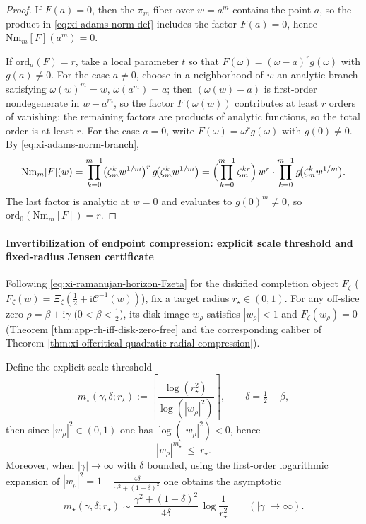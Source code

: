 \begin{proof}
If \(F(a)=0\), then the \(\pi_m\)-fiber over \(w=a^m\) contains the point \(a\), so the product in \eqref{eq:xi-adams-norm-def} includes the factor \(F(a)=0\), hence \(\mathrm{Nm}_m[F](a^m)=0\).
\par
If \(\mathrm{ord}_a(F)=r\), take a local parameter \(t\) so that \(F(\omega)=(\omega-a)^r g(\omega)\) with \(g(a)\neq 0\).
For the case \(a\neq 0\), choose in a neighborhood of \(w\) an analytic branch satisfying \(\omega(w)^m=w\), \(\omega(a^m)=a\); then
\((\omega(w)-a)\) is first-order nondegenerate in \(w-a^m\), so the factor \(F(\omega(w))\) contributes at least \(r\) orders of vanishing; the remaining factors are products of analytic functions, so the total order is at least \(r\).
For the case \(a=0\), write \(F(\omega)=\omega^{r}g(\omega)\) with \(g(0)\neq 0\).
By \eqref{eq:xi-adams-norm-branch},
\[
\mathrm{Nm}_m[F](w)
=\prod_{k=0}^{m-1}\bigl(\zeta_m^k w^{1/m}\bigr)^{r}\,g\!\bigl(\zeta_m^k w^{1/m}\bigr)
=\Bigl(\prod_{k=0}^{m-1}\zeta_m^{kr}\Bigr)\,w^{r}\cdot \prod_{k=0}^{m-1}g\!\bigl(\zeta_m^k w^{1/m}\bigr).
\]
The last factor is analytic at \(w=0\) and evaluates to \(g(0)^m\neq 0\), so \(\mathrm{ord}_{0}(\mathrm{Nm}_m[F])=r\).
\qedhere
\end{proof}

\paragraph{Invertibilization of endpoint compression: explicit scale threshold and fixed-radius Jensen certificate}
Following \eqref{eq:xi-ramanujan-horizon-Fzeta} for the diskified completion object \(F_\zeta\) (\(F_\zeta(w)=\Xi_\zeta(\frac12+\mathrm{i}\mathcal{C}^{-1}(w))\)), fix a target radius \(r_\star\in(0,1)\).
For any off-slice zero \(\rho=\beta+\mathrm{i}\gamma\) (\(0<\beta<\tfrac12\)), its disk image \(w_\rho\) satisfies \(|w_\rho|<1\) and \(F_\zeta(w_\rho)=0\) (Theorem \ref{thm:app-rh-iff-disk-zero-free} and the corresponding caliber of Theorem \ref{thm:xi-offcritical-quadratic-radial-compression}).
\par
Define the explicit scale threshold
\begin{equation}\label{eq:xi-adams-norm-mstar-def}
m_\star(\gamma,\delta;r_\star)
:=\left\lceil \frac{\log(r_\star^{2})}{\log(|w_\rho|^{2})}\right\rceil,
\qquad
\delta=\tfrac12-\beta,
\end{equation}
then since \(|w_\rho|^2\in(0,1)\) one has \(\log(|w_\rho|^2)<0\), hence
\begin{equation}\label{eq:xi-adams-norm-mstar-radius}
|w_\rho|^{m_\star}\ \le\ r_\star.
\end{equation}
Moreover, when \(|\gamma|\to\infty\) with \(\delta\) bounded, using the first-order logarithmic expansion of
\(|w_\rho|^{2}=1-\frac{4\delta}{\gamma^{2}+(1+\delta)^{2}}\) one obtains the asymptotic
\begin{equation}\label{eq:xi-adams-norm-mstar-asymptotic}
\boxed{\;
m_\star(\gamma,\delta;r_\star)
\sim
\frac{\gamma^{2}+(1+\delta)^{2}}{4\delta}\,\log\!\frac{1}{r_\star^{2}}
\qquad(|\gamma|\to\infty).\;}
\end{equation}

